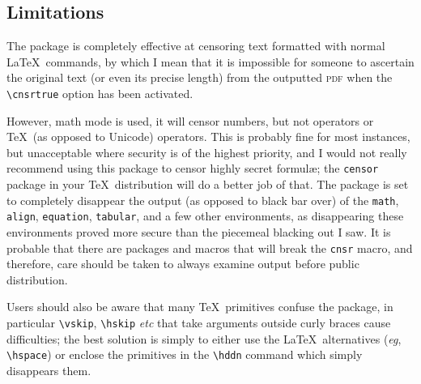 \documentclass{article}
\begin{document}
\subsection{\color{red}Limitations}
The package is completely effective at censoring text formatted with normal \LaTeX\ commands, by which I mean that it is impossible for someone to ascertain the original text (or even its precise length) from the outputted \MakeLowercase{\textsc{PDF}} when the \verb|\cnsrtrue| option has been activated.   

 However, math mode is used, it will censor numbers, but not operators or \TeX\ (as opposed to Unicode) operators.  This is probably fine for most instances, but unacceptable where security is of the highest priority, and I would not really recommend using this package to censor highly secret formulæ; the \texttt{censor} package in your \TeX\ distribution will do a better job of that.  The package is set to completely disappear the output (as opposed to black bar over) of the \texttt{math}, \texttt{align}, \texttt{equation}, \texttt{tabular}, and a few other environments, as disappearing these environments proved more secure than the piecemeal blacking out I saw.  It is probable that there are packages and macros that will break the \texttt{cnsr} macro, and therefore, care should be taken to always examine output before public distribution.
 
 Users should also be aware that many \TeX\ primitives confuse the package, in particular \verb+\vskip+, \verb+\hskip+ \textit{etc} that take arguments outside curly braces cause difficulties; the best solution is simply to either use the \LaTeX\ alternatives (\textit{eg}, \verb+\hspace+) or enclose the primitives in the \verb+\hddn+ command which simply disappears them.
\end{document}
